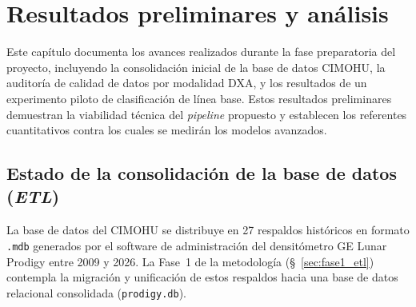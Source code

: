 \documentclass[../tesis.tex]{subfiles}
\begin{document}
\chapter{Resultados preliminares y análisis}
\label{cap:resultados}

Este capítulo documenta los avances realizados durante la fase preparatoria del proyecto, incluyendo la consolidación inicial de la base de datos CIMOHU, la auditoría de calidad de datos por modalidad DXA, y los resultados de un experimento piloto de clasificación de línea base. Estos resultados preliminares demuestran la viabilidad técnica del \textit{pipeline} propuesto y establecen los referentes cuantitativos contra los cuales se medirán los modelos avanzados.

\section{Estado de la consolidación de la base de datos (\textit{ETL})}
\label{sec:resultados_etl}

La base de datos del CIMOHU se distribuye en 27 respaldos históricos en formato \texttt{.mdb} generados por el software de administración del densitómetro GE Lunar Prodigy entre 2009 y 2026. La Fase~1 de la metodología (§~\ref{sec:fase1_etl}) contempla la migración y unificación de estos respaldos hacia una base de datos relacional consolidada (\texttt{prodigy.db}).
\end{document}
